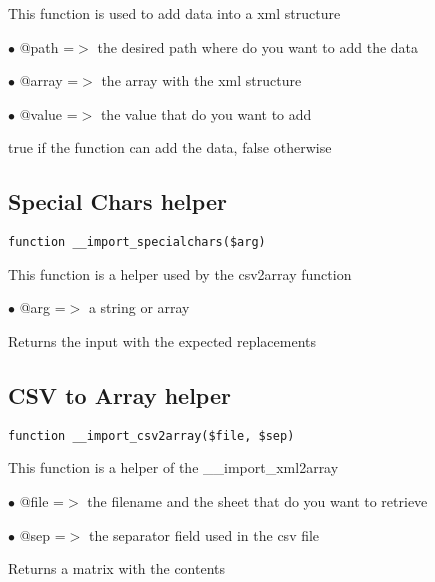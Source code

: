 \documentclass[a4paper]{book}
\begin{document}
This function is used to add data into a xml structure

\begin{compactitem}
\item[\color{myblue}$\bullet$] @path  =$>$ the desired path where do you want to add the data
\item[\color{myblue}$\bullet$] @array =$>$ the array with the xml structure
\item[\color{myblue}$\bullet$] @value =$>$ the value that do you want to add
\end{compactitem}

true if the function can add the data, false otherwise

\hypertarget{toc162}{}
\subsection{Special Chars helper}

\begin{lstlisting}
function __import_specialchars($arg)
\end{lstlisting}

This function is a helper used by the csv2array function

\begin{compactitem}
\item[\color{myblue}$\bullet$] @arg =$>$ a string or array
\end{compactitem}

Returns the input with the expected replacements

\hypertarget{toc163}{}
\subsection{CSV to Array helper}

\begin{lstlisting}
function __import_csv2array($file, $sep)
\end{lstlisting}

This function is a helper of the \_\_import\_xml2array

\begin{compactitem}
\item[\color{myblue}$\bullet$] @file =$>$ the filename and the sheet that do you want to retrieve
\item[\color{myblue}$\bullet$] @sep  =$>$ the separator field used in the csv file
\end{compactitem}

Returns a matrix with the contents
\end{document}
